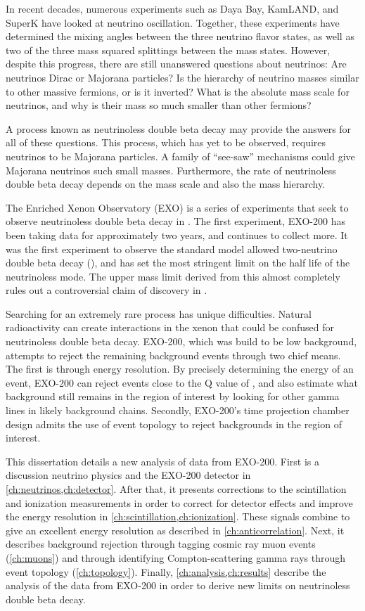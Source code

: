\documentclass[herrin-thesis.tex]{subfiles}
\begin{document}
In recent decades, numerous experiments such as Daya Bay, KamLAND, and SuperK  have looked at neutrino oscillation. Together, these experiments have determined the mixing angles between the three neutrino flavor states, as well as two of the three mass squared splittings between the mass states. However, despite this progress, there are still unanswered questions about neutrinos: Are neutrinos Dirac or Majorana particles? Is the hierarchy of neutrino masses similar to other massive fermions, or is it inverted? What is the absolute mass scale for neutrinos, and why is their mass so much smaller than other fermions?

A process known as neutrinoless double beta decay may provide the answers for all of these questions. This process, which has yet to be observed, requires neutrinos to be Majorana particles. A family of ``see-saw'' mechanisms could give Majorana neutrinos such small masses. Furthermore, the rate of neutrinoless double beta decay depends on the mass scale and also the mass hierarchy.

The Enriched Xenon Observatory (EXO) is a series of experiments that seek to observe neutrinoless double beta decay in . The first experiment, EXO-200 has been taking data for approximately two years, and continues to collect more. It was the first experiment to observe the standard model allowed two-neutrino double beta decay (\twonu)\cite{Ackerman:2011gz}, and has set the most stringent limit on the half life of the neutrinoless mode\cite{Auger:2012ar}. The upper mass limit derived from this almost completely rules out a controversial claim of discovery in .

Searching for an extremely rare process has unique difficulties. Natural radioactivity can create interactions in the xenon that could be confused for neutrinoless double beta decay. EXO-200, which was build to be low background, attempts to reject the remaining background events through two chief means. The first is through energy resolution. By precisely determining the energy of an event, EXO-200 can reject events close to the Q value of , and also estimate what background still remains in the region of interest by looking for other gamma lines in likely background chains. Secondly, EXO-200's time projection chamber design admits the use of event topology to reject backgrounds in the region of interest.

This dissertation details a new analysis of data from EXO-200. First is a discussion neutrino physics and the EXO-200 detector in \cref{ch:neutrinos,ch:detector}. After that, it presents corrections to the scintillation and ionization measurements in order to correct for detector effects and improve the energy resolution in \cref{ch:scintillation,ch:ionization}. These signals combine to give an excellent energy resolution as described in \cref{ch:anticorrelation}. Next, it describes background rejection through tagging cosmic ray muon events (\cref{ch:muons}) and through identifying Compton-scattering gamma rays through event topology (\cref{ch:topology}). Finally, \cref{ch:analysis,ch:results} describe the analysis of the data from EXO-200 in order to derive new limits on neutrinoless double beta decay. 
\end{document}
